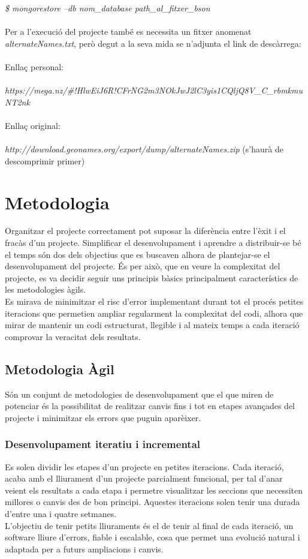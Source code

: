 \documentclass[12pt,a4paper,openright,oneside]{article}
\numberwithin{equation}{section}
\theoremstyle{definition}
\begin{document}
\emph{\$ mongorestore --db nom\_database path\_al\_fitxer\_bson}
\\\\
Per a l'execució del projecte també es necessita un fitxer anomenat \emph{alternateNames.txt}, però degut a la seva mida se n'adjunta el link de
descàrrega:\\\\
Enllaç personal:\\\\ \emph{https://mega.nz/\#!HlwEiJ6R!CFrNG2m3NOkJwJ2lC3yis1CQljQ8V\_C\_rbmkmuNT2nk}\\\\
Enllaç original:\\\\ \emph{http://download.geonames.org/export/dump/alternateNames.zip} (s'haurà de descomprimir primer)


\newpage


\section{Metodologia}
Organitzar el projecte correctament pot suposar la diferència entre l'èxit i el fracàs d'un projecte. Simplificar el desenvolupament i aprendre a distribuir-se bé el temps són dos dels objectius que es buscaven alhora de plantejar-se el desenvolupament del projecte.
És per això, que en veure la complexitat del projecte, es va decidir seguir uns principis bàsics principalment característics de les metodologies àgils.\\
Es mirava de minimitzar el risc d'error implementant durant tot el procés petites iteracions que permetien ampliar regularment la complexitat del codi, alhora que mirar de mantenir un codi estructurat, llegible i al mateix temps a cada iteració comprovar la veracitat dels resultats.\\
\subsection{Metodologia Àgil}
Són un conjunt de metodologies de desenvolupament que el que miren de potenciar és la possibilitat de realitzar canvis fins i tot en etapes avançades del projecte i minimitzar els errors que puguin aparèixer.\\
\subsubsection*{Desenvolupament iteratiu i incremental}
Es solen dividir les etapes d'un projecte en petites iteracions. Cada iteració, acaba amb el lliurament d'un projecte parcialment funcional, per tal d'anar veient els resultats a cada etapa i permetre visualitzar les seccions que necessiten millores o canvis des de bon principi. Aquestes iteracions solen tenir una durada d'entre una i quatre setmanes.\\
L'objectiu de tenir petits lliuraments és el de tenir al final de cada iteració, un software lliure d'errors, fiable i escalable, cosa que permet una evolució natural i adaptada per a futurs ampliacions i canvis.\\
\end{document}
